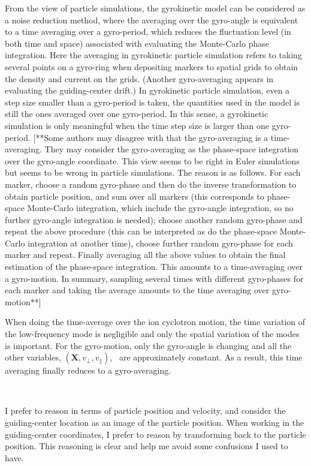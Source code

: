 \documentclass{llncs}
\begin{document}
From the view of particle simulations, the gyrokinetic model can be
considered as a noise reduction method, where the averaging over the
gyro-angle is equivalent to a time averaging over a gyro-period, which reduces
the fluctuation level (in both time and space) associated with evaluating the
Monte-Carlo phase integration. Here the averaging in gyrokinetic particle
simulation refers to taking several points on a gyro-ring when depositing
markers to spatial grids to obtain the density and current on the grids.
(Another gyro-averaging appears in evaluating the guiding-center drift.) In
gyrokinetic particle simulation, even a step size smaller than a gyro-period
is taken, the quantities used in the model is still the ones averaged over one
gyro-period. In this sense, a gyrokinetic simulation is only meaningful when
the time step size is larger than one gyro-period. [**Some authors may
disagree with that the gyro-averaging is a time-averaging. They may consider
the gyro-averaging as the phase-space integration over the gyro-angle
coordinate. This view seems to be right in Euler simulations but seems to be
wrong in particle simulations. The reason is as follows. For each marker,
choose a random gyro-phase and then do the inverse transformation to obtain
particle position, and sum over all markers (this corresponds to phase-space
Monte-Carlo integration, which include the gyro-angle integration, so no
further gyro-angle integration is needed); choose another random gyro-phase
and repeat the above procedure (this can be interpreted as do the phase-space
Monte-Carlo integration at another time), choose further random gyro-phase for
each marker and repeat. Finally averaging all the above values to obtain the
final estimation of the phase-space integration. This amounts to a
time-averaging over a gyro-motion. In summary, sampling several times with
different gyro-phases for each marker and taking the average amounts to the
time averaging over gyro-motion**]

When doing the time-average over the ion cyclotron motion, the time variation
of the low-frequency mode is negligible and only the spatial variation of the
modes is important. For the gyro-motion, only the gyro-angle is changing and
all the other variables, $(\mathbf{X}, v_{\perp}, v_{\parallel})$, \ are
approximately constant. As a result, this time averaging finally reduces to a
gyro-averaging.

\

I prefer to reason in terms of particle position and velocity, and consider
the guiding-center location as an image of the particle position. When working
in the guiding-center coordinates, I prefer to reason by transforming back to
the particle position. This reasoning is clear and help me avoid some
confusions I used to have.
\end{document}

